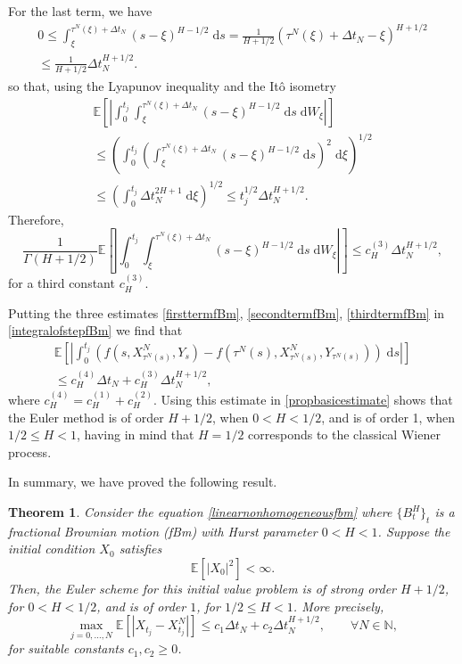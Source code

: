 \documentclass[reqno,12pt]{amsart}
\theoremstyle{plain} %
\newtheorem{theorem}{Theorem}[section]
\theoremstyle{definition} %
\begin{document}
For the last term, we have
\begin{multline*}
    0 \leq \int_\xi^{\tau^N(\xi) + \Delta t_N} (s - \xi)^{H-1/2} \;\mathrm{d}s = \frac{1}{H + 1/2} (\tau^N(\xi) + \Delta t_N - \xi)^{H + 1/2} \\
    \leq \frac{1}{H + 1/2} \Delta t_N^{H + 1/2}.
\end{multline*}
so that, using the Lyapunov inequality and the It\^o isometry
\begin{multline*}
    \mathbb{E}\left[\left|\int_0^{t_j} \int_\xi^{\tau^N(\xi) + \Delta t_N} (s - \xi)^{H-1/2} \;\mathrm{d}s \;\mathrm{d}W_\xi\right|\right] \\
    \leq \left( \int_0^{t_j} \left(\int_\xi^{\tau^N(\xi) + \Delta t_N} (s - \xi)^{H-1/2} \;\mathrm{d}s\right)^2 \;\mathrm{d}\xi\right)^{1/2} \\ 
    \leq \left( \int_0^{t_j} \Delta t_N^{2H + 1} \;\mathrm{d}\xi\right)^{1/2} \leq t_j^{1/2} \Delta t_N^{H + 1/2}.
\end{multline*}
Therefore,
\begin{equation}
    \label{thirdtermfBm}
    \frac{1}{\Gamma(H + 1/2)}\mathbb{E}\left[\left|\int_0^{t_j} \int_\xi^{\tau^N(\xi) + \Delta t_N} (s - \xi)^{H-1/2} \;\mathrm{d}s \;\mathrm{d}W_\xi\right|\right] \leq c_H^{(3)} \Delta t_N^{H + 1/2},
\end{equation}
for a third constant $c_H^{(3)}$.

Putting the three estimates \eqref{firsttermfBm}, \eqref{secondtermfBm}, \eqref{thirdtermfBm} in \eqref{integralofstepfBm} we find that
\begin{multline}
    \mathbb{E}\left[\left|\int_0^{t_j} \left( f(s, X_{\tau^N(s)}^N, Y_s) - f(\tau^N(s), X_{\tau^N(s)}^N, Y_{\tau^N(s)}) \right)\;\mathrm{d}s\right|\right] \\
    \leq c_H^{(4)} \Delta t_N + c_H^{(3)} \Delta t_N^{H + 1/2},
\end{multline}
where $c_H^{(4)} = c_H^{(1)} + c_H^{(2)}$. Using this estimate in \cref{propbasicestimate} shows that the Euler method is of order $H + 1/2$, when $0 < H < 1/2$, and is of order 1, when $1/2 \leq H < 1$, having in mind that $H=1/2$ corresponds to the classical Wiener process.

In summary, we have proved the following result.
\begin{theorem}
    Consider the equation \eqref{linearnonhomogeneousfbm} where $\{B^H_t\}_t$ is a fractional Brownian motion (fBm) with Hurst parameter $0 < H < 1$. Suppose the initial condition $X_0$ satisfies
    \begin{equation}
        \label{EX0square2b}
        \mathbb{E}[|X_0|^2] < \infty.
    \end{equation}
    Then, the Euler scheme for this initial value problem is of strong order $H+1/2$, for $0 < H < 1/2$, and is of order $1$, for $1/2 \leq H < 1$. More precisely,
    \begin{equation}
        \max_{j=0, \ldots, N}\mathbb{E}\left[ \left| X_{t_j} - X_{t_j}^N \right| \right] \leq c_1 \Delta t_N + c_2 \Delta t_N^{H + 1/2}, \qquad \forall N \in \mathbb{N},
    \end{equation}
    for suitable constants $c_1, c_2 \geq 0$.
\end{theorem}
\end{document}
